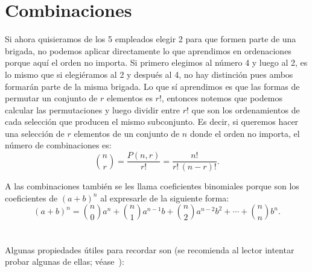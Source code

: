 \section{Combinaciones}
Si ahora quisieramos de los 5 empleados elegir 2 para que formen parte de una brigada, no podemos aplicar directamente lo que aprendimos en ordenaciones porque aquí el orden no importa. Si primero elegimos al número 4 y luego al 2, es lo mismo que si elegiéramos al 2 y después al 4, no hay distinción pues ambos formarán parte de la misma brigada. Lo que sí aprendimos es que las formas de permutar un conjunto de $r$ elementos es $r!$, entonces notemos que podemos calcular las permutaciones y luego dividir entre $r!$ que son los ordenamientos de cada selección que producen el mismo subconjunto. Es decir, si queremos hacer una selección de $r$ elementos de un conjunto de $n$ donde el orden no importa, el número de combinaciones es:
\[
\binom{n}{r} = \frac{P(n,r)}{r!} = \frac{n!}{r!\,(n-r)!}.
\]
\begin{figure}[H]
\centering
{}
\end{figure}
 
A las combinaciones también se les llama coeficientes binomiales porque son los coeficientes de $(a+b)^n$ al expresarle de la siguiente forma:
\[
(a+b)^n=\binom{n}{0}a^n+\binom{n}{1}a^{n-1}b+\binom{n}{2}a^{n-2}b^2+\cdots + \binom{n}{n}b^n.
\]
\\\\
Algunas propiedades útiles para recordar son (se recomienda al lector intentar probar algunas de ellas; véase~\cite{perez_combinatoria}):

